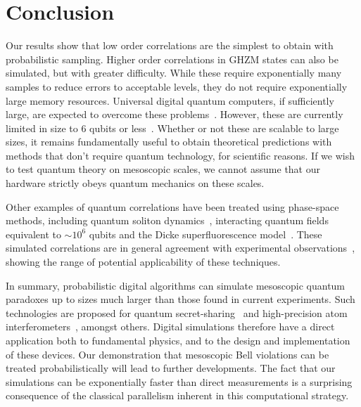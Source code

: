 \section{Conclusion}


Our results show that low order correlations are the simplest to obtain with probabilistic sampling.
Higher order correlations in GHZM states can also be simulated, but with greater difficulty.
While these require exponentially many samples to reduce errors to acceptable levels, they do not require exponentially large memory resources.
Universal digital quantum computers, if sufficiently large, are expected to overcome these problems~\cite{Lloyd1996}.
However, these are currently limited in size to 6 qubits or less~\cite{Lanyon2011}.
Whether or not these are scalable to large sizes, it remains fundamentally useful to obtain theoretical predictions with methods that don't require quantum technology, for scientific reasons.
If we wish to test quantum theory on mesoscopic scales, we cannot assume that our hardware strictly obeys quantum mechanics on these scales.

Other examples of quantum correlations have been treated using phase-space methods, including quantum soliton dynamics~\cite{Drummond1993a}, interacting quantum fields~\cite{Deuar2007} equivalent to $\sim10^{6}$ qubits and the Dicke superfluorescence model~\cite{Altland2012}.
These simulated correlations are in general agreement with experimental observations~\cite{Jaskula2010}, showing the range of potential applicability of these techniques.

In summary, probabilistic digital algorithms can simulate mesoscopic quantum paradoxes up to sizes much larger than those found in current experiments.
Such technologies are proposed for quantum secret-sharing~\cite{Hillery1999} and high-precision atom interferometers~\cite{He2011}, amongst others.
Digital simulations therefore have a direct application both to fundamental physics, and to the design and implementation of these devices.
Our demonstration that mesoscopic Bell violations can be treated probabilistically will lead to further developments.
The fact that our simulations can be exponentially faster than direct measurements is a surprising consequence of the classical parallelism inherent in this computational strategy.

